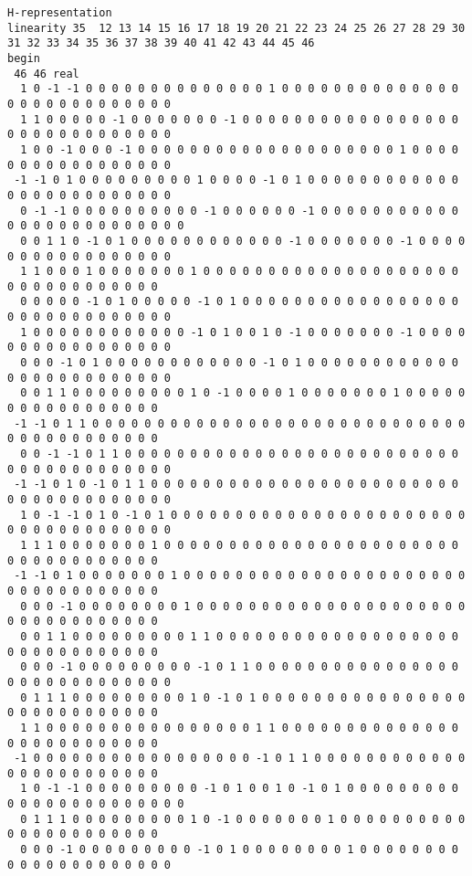 \documentclass[%
 showpacs,
 showkeys,
 preprintnumbers,
 amsmath,amssymb,
 aps,
  pra,
  longbibliography,
 floatfix,
 ]{revtex4-1}
\begin{document}
{\begin{lstlisting}[backgroundcolor=\color{yellow!10},framerule=0pt,breaklines=true, frame=tb]
H-representation
linearity 35  12 13 14 15 16 17 18 19 20 21 22 23 24 25 26 27 28 29 30 31 32 33 34 35 36 37 38 39 40 41 42 43 44 45 46
begin
 46 46 real
  1 0 -1 -1 0 0 0 0 0 0 0 0 0 0 0 0 0 0 1 0 0 0 0 0 0 0 0 0 0 0 0 0 0 0 0 0 0 0 0 0 0 0 0 0 0 0
  1 1 0 0 0 0 0 -1 0 0 0 0 0 0 0 -1 0 0 0 0 0 0 0 0 0 0 0 0 0 0 0 0 0 0 0 0 0 0 0 0 0 0 0 0 0 0
  1 0 0 -1 0 0 0 -1 0 0 0 0 0 0 0 0 0 0 0 0 0 0 0 0 0 0 0 0 1 0 0 0 0 0 0 0 0 0 0 0 0 0 0 0 0 0
 -1 -1 0 1 0 0 0 0 0 0 0 0 0 1 0 0 0 0 -1 0 1 0 0 0 0 0 0 0 0 0 0 0 0 0 0 0 0 0 0 0 0 0 0 0 0 0
  0 -1 -1 0 0 0 0 0 0 0 0 0 0 -1 0 0 0 0 0 0 -1 0 0 0 0 0 0 0 0 0 0 0 0 0 0 0 0 0 0 0 0 0 0 0 0 0
  0 0 1 1 0 -1 0 1 0 0 0 0 0 0 0 0 0 0 0 0 -1 0 0 0 0 0 0 0 -1 0 0 0 0 0 0 0 0 0 0 0 0 0 0 0 0 0
  1 1 0 0 0 1 0 0 0 0 0 0 0 1 0 0 0 0 0 0 0 0 0 0 0 0 0 0 0 0 0 0 0 0 0 0 0 0 0 0 0 0 0 0 0 0
  0 0 0 0 0 -1 0 1 0 0 0 0 0 -1 0 1 0 0 0 0 0 0 0 0 0 0 0 0 0 0 0 0 0 0 0 0 0 0 0 0 0 0 0 0 0 0
  1 0 0 0 0 0 0 0 0 0 0 0 0 -1 0 1 0 0 1 0 -1 0 0 0 0 0 0 0 -1 0 0 0 0 0 0 0 0 0 0 0 0 0 0 0 0 0
  0 0 0 -1 0 1 0 0 0 0 0 0 0 0 0 0 0 0 -1 0 1 0 0 0 0 0 0 0 0 0 0 0 0 0 0 0 0 0 0 0 0 0 0 0 0 0
  0 0 1 1 0 0 0 0 0 0 0 0 0 1 0 -1 0 0 0 0 1 0 0 0 0 0 0 0 1 0 0 0 0 0 0 0 0 0 0 0 0 0 0 0 0 0
 -1 -1 0 1 1 0 0 0 0 0 0 0 0 0 0 0 0 0 0 0 0 0 0 0 0 0 0 0 0 0 0 0 0 0 0 0 0 0 0 0 0 0 0 0 0 0
  0 0 -1 -1 0 1 1 0 0 0 0 0 0 0 0 0 0 0 0 0 0 0 0 0 0 0 0 0 0 0 0 0 0 0 0 0 0 0 0 0 0 0 0 0 0 0
 -1 -1 0 1 0 -1 0 1 1 0 0 0 0 0 0 0 0 0 0 0 0 0 0 0 0 0 0 0 0 0 0 0 0 0 0 0 0 0 0 0 0 0 0 0 0 0
  1 0 -1 -1 0 1 0 -1 0 1 0 0 0 0 0 0 0 0 0 0 0 0 0 0 0 0 0 0 0 0 0 0 0 0 0 0 0 0 0 0 0 0 0 0 0 0
  1 1 1 0 0 0 0 0 0 0 1 0 0 0 0 0 0 0 0 0 0 0 0 0 0 0 0 0 0 0 0 0 0 0 0 0 0 0 0 0 0 0 0 0 0 0
 -1 -1 0 1 0 0 0 0 0 0 0 1 0 0 0 0 0 0 0 0 0 0 0 0 0 0 0 0 0 0 0 0 0 0 0 0 0 0 0 0 0 0 0 0 0 0
  0 0 0 -1 0 0 0 0 0 0 0 0 1 0 0 0 0 0 0 0 0 0 0 0 0 0 0 0 0 0 0 0 0 0 0 0 0 0 0 0 0 0 0 0 0 0
  0 0 1 1 0 0 0 0 0 0 0 0 0 1 1 0 0 0 0 0 0 0 0 0 0 0 0 0 0 0 0 0 0 0 0 0 0 0 0 0 0 0 0 0 0 0
  0 0 0 -1 0 0 0 0 0 0 0 0 0 -1 0 1 1 0 0 0 0 0 0 0 0 0 0 0 0 0 0 0 0 0 0 0 0 0 0 0 0 0 0 0 0 0
  0 1 1 1 0 0 0 0 0 0 0 0 0 1 0 -1 0 1 0 0 0 0 0 0 0 0 0 0 0 0 0 0 0 0 0 0 0 0 0 0 0 0 0 0 0 0
  1 1 0 0 0 0 0 0 0 0 0 0 0 0 0 0 0 0 1 1 0 0 0 0 0 0 0 0 0 0 0 0 0 0 0 0 0 0 0 0 0 0 0 0 0 0
 -1 0 0 0 0 0 0 0 0 0 0 0 0 0 0 0 0 0 -1 0 1 1 0 0 0 0 0 0 0 0 0 0 0 0 0 0 0 0 0 0 0 0 0 0 0 0
  1 0 -1 -1 0 0 0 0 0 0 0 0 0 -1 0 1 0 0 1 0 -1 0 1 0 0 0 0 0 0 0 0 0 0 0 0 0 0 0 0 0 0 0 0 0 0 0
  0 1 1 1 0 0 0 0 0 0 0 0 0 1 0 -1 0 0 0 0 0 0 0 1 0 0 0 0 0 0 0 0 0 0 0 0 0 0 0 0 0 0 0 0 0 0
  0 0 0 -1 0 0 0 0 0 0 0 0 0 -1 0 1 0 0 0 0 0 0 0 0 1 0 0 0 0 0 0 0 0 0 0 0 0 0 0 0 0 0 0 0 0 0

\end{lstlisting}}
\end{document}

